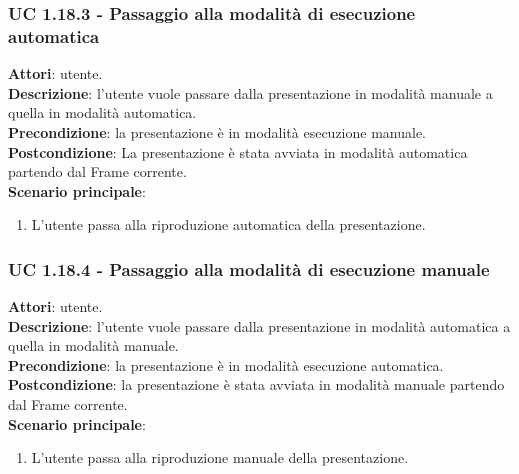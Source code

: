	\subsubsection{UC 1.18.3 - Passaggio alla modalità di esecuzione automatica}{
		\label{uc1.18.3}
		\textbf{Attori}: utente. \\
		\textbf{Descrizione}: l'utente vuole passare dalla presentazione in modalità manuale a quella in modalità automatica. \\
		\textbf{Precondizione}: la presentazione è in modalità esecuzione manuale.	\\
		\textbf{Postcondizione}: La presentazione è stata avviata in modalità automatica partendo dal Frame corrente.\\
		\textbf{Scenario principale}:
		\begin{enumerate}
			\item L'utente passa alla riproduzione automatica della presentazione.
		\end{enumerate}						
	}
	\subsubsection{UC 1.18.4 - Passaggio alla modalità di esecuzione manuale}{
		\label{uc1.18.4}
		\textbf{Attori}: utente. \\
		\textbf{Descrizione}: l'utente vuole passare dalla presentazione in modalità automatica a quella in modalità manuale. \\
		\textbf{Precondizione}: la presentazione è in modalità esecuzione automatica.	\\
		\textbf{Postcondizione}: la presentazione è stata avviata in modalità manuale partendo dal Frame corrente.\\
		\textbf{Scenario principale}:
		\begin{enumerate}
			\item L'utente passa alla riproduzione manuale della presentazione.
		\end{enumerate}						
	}